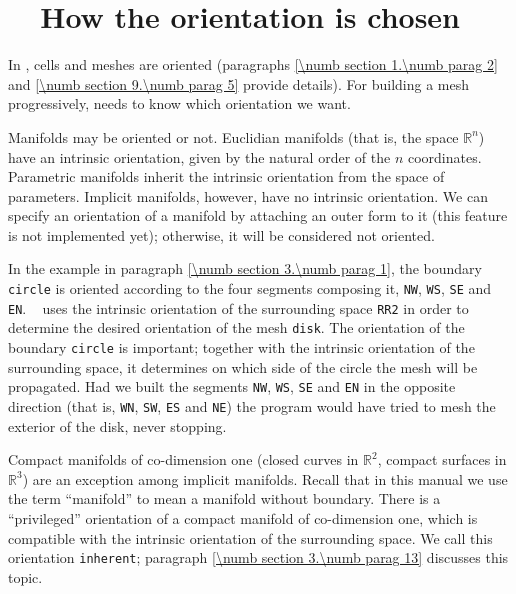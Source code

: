 \section{~~How the orientation is chosen}\label{\numb section 3.\numb parag 10}

In \maniFEM, cells and meshes are oriented (paragraphs \ref{\numb section 1.\numb parag 2}
and \ref{\numb section 9.\numb parag 5} provide details).
For building a mesh progressively, {\maniFEM} needs to know which orientation we want.

Manifolds may be oriented or not.
Euclidian manifolds (that is, the space $ \mathbb{R}^n $) have an intrinsic orientation,
given by the natural order of the $n$ coordinates.
Parametric manifolds inherit the intrinsic orientation from the space of parameters.
Implicit manifolds, however, have no intrinsic orientation.
We can specify an orientation of a manifold by attaching an outer form to it
(this feature is not implemented yet); otherwise, it will be considered not oriented.

In the example in paragraph \ref{\numb section 3.\numb parag 1}, the boundary {\small\tt circle}
is oriented according to the four segments composing it, {\small\tt NW}, {\small\tt WS},
{\small\tt SE} and {\small\tt EN}.
\ {\ManiFEM} uses the intrinsic orientation of the surrounding space {\small\tt RR2} in order
to determine the desired orientation of the mesh {\small\tt disk}.
The orientation of the boundary {\small\tt circle} is important;
together with the intrinsic orientation of the surrounding space,
it determines on which side of the circle the mesh will be propagated.
Had we built the segments {\small\tt NW}, {\small\tt WS}, {\small\tt SE} and {\small\tt EN} in the
opposite direction (that is, {\small\tt WN}, {\small\tt SW}, {\small\tt ES} and {\small\tt NE})
the program would have tried to mesh the exterior of the disk, never stopping.

Compact manifolds of co-dimension one (closed curves in $ \mathbb{R}^2 $,
compact surfaces in $ \mathbb{R}^3 $) are an exception among implicit manifolds.
Recall that in this manual we use the term ``manifold'' to mean a manifold without boundary.
There is a ``privileged'' orientation of a compact manifold of co-dimension one,
which is compatible with the intrinsic orientation of the surrounding space.
We call this orientation {\small\tt inherent}; paragraph \ref{\numb section 3.\numb parag 13}
discusses this topic.

